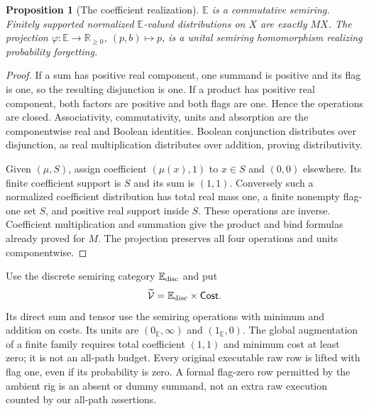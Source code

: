 \documentclass[11pt,a4paper]{article}
\newtheorem{proposition}[theorem]{Proposition}
\theoremstyle{definition}
\newcommand{\Cost}{\mathsf{Cost}}
\newcommand{\E}{\mathbb E}
\begin{document}
\begin{proposition}[The coefficient realization]\label{prop:E}
$\E$ is a commutative semiring. Finitely supported normalized
$\E$-valued distributions on $X$ are exactly $MX$. The projection
$\varphi:\E\to\mathbb R_{\geq0}$, $(p,b)\mapsto p$, is a unital
semiring homomorphism realizing probability forgetting.
\end{proposition}
\begin{proof}
If a sum has positive real component, one summand is positive and its
flag is one, so the resulting disjunction is one. If a product has
positive real component, both factors are positive and both flags are
one. Hence the operations are closed. Associativity, commutativity,
units and absorption are the componentwise real and Boolean identities.
Boolean conjunction distributes over disjunction, as real multiplication
distributes over addition, proving distributivity.

Given $(\mu,S)$, assign coefficient $(\mu(x),1)$ to $x\in S$ and
$(0,0)$ elsewhere. Its finite coefficient support is $S$ and its sum is
$(1,1)$. Conversely such a normalized coefficient distribution has total
real mass one, a finite nonempty flag-one set $S$, and positive real
support inside $S$. These operations are inverse. Coefficient
multiplication and summation give the product and bind formulas already
proved for $M$. The projection preserves all four operations and units
componentwise.
\end{proof}

Use the discrete semiring category $\E_{\rm disc}$ and put
\[
 \widetilde{\mathcal V}=\E_{\rm disc}\times\Cost.
\]
Its direct sum and tensor use the semiring operations with minimum and
addition on costs. Its units are $(0_{\E},\infty)$ and $(1_{\E},0)$.
The global augmentation of a finite family requires total coefficient
$(1,1)$ and minimum cost at least zero; it is not an all-path budget.
Every original executable raw row is lifted with flag one, even if its
probability is zero. A formal flag-zero row permitted by the ambient rig
is an absent or dummy summand, not an extra raw execution counted by
our all-path assertions.
\end{document}
